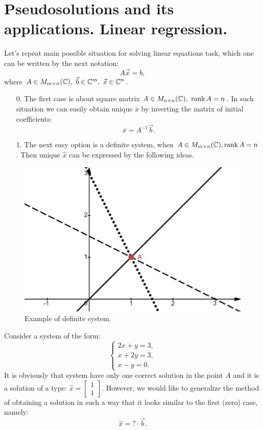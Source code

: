 \setcounter{section}{1}
\section{Pseudosolutions and its applications. Linear regression.}
\par 
Let's repeat main possible situation for solving linear equations task, which one can be written by the next notation:
\[
    A\vec{x} = b,  
\]
where $A \in M_{m\times n}(\mathbb{C}), \ \vec{b} \in \mathbb{C}^m, \ \vec{x} \in \mathbb{C}^n$.
\begin{itemize}
    \item[0. ] The first case is about square matrix $A \in M_{n\times n}(\mathbb{C}), \ \operatorname{rank} A = n$. In such situation we can easily obtain unique $\overline{x}$ by inverting the matrix of initial coefficients:
    \[
        \overline{x}  = A^{-1}\vec{b}.
    \]
    \item[1. ] The next easy option is a definite system, when $A \in M_{m\times n}(\mathbb{C}), \operatorname{rank} A=n$. Then unique $\hat{x}$ can be expressed by the following ideas.
\end{itemize}

    \begin{figure}
        \includegraphics[height=0.333\columnwidth, width=0.5\columnwidth]{lectures/images/definite_system.png}
        \caption*{\scriptsize{Example of definite system.}}
        \label{fig:definite_system}
    \end{figure}
    Consider a system of the form:
    \[
        \left\{
            \begin{array}{l}
                2x+y = 3,\\
                x+2y = 3,\\
                x-y = 0.
            \end{array}
        \right.  
    \]
    It is obviously that system have only one correct solution in the point $A$ and it is a solution of a type: $\hat{x} = \begin{bmatrix}
        1\\ 1
    \end{bmatrix}$. However, we would like to generalize the method of obtaining a solution in such a way that it looks similar to the first (zero) case, namely:
    \[
        \hat{x} = ?\cdot \vec{b}.  
    \]

